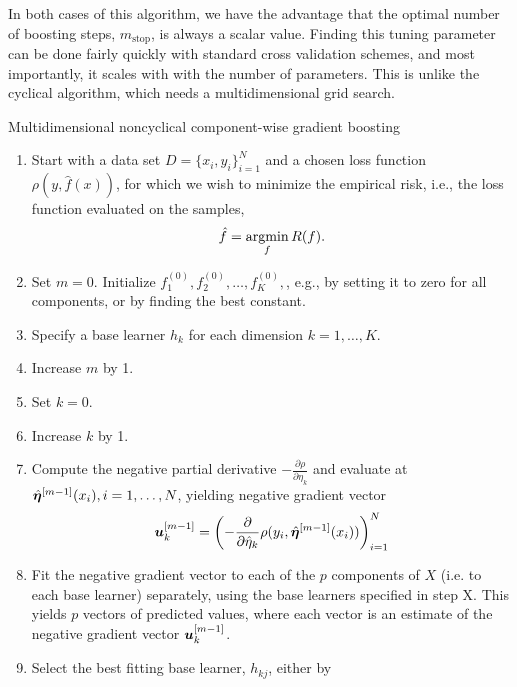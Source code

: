In both cases of this algorithm, we have the advantage that the optimal number of boosting steps, $m_{\text{stop}}$, is always a scalar value. Finding this tuning parameter can be done fairly quickly with standard cross validation schemes, and most importantly, it scales with with the number of parameters. This is unlike the cyclical algorithm, which needs a multidimensional grid search.

\begin{algorithm}
\caption{Multidimensional noncyclical component-wise gradient boosting}
\label{algo:multi-noncyclical}
\begin{enumerate}
    \item Start with a data set $D=\{x_i, y_i\}_{i=1}^N$ and a chosen loss function $\rho(y,\hat{f}(x))$, for which we wish to
        minimize the empirical risk, i.e., the loss function evaluated on the samples,
        \begin{equation}
            \hat{f}=\operatorname*{argmin}_{f}R(f).
        \end{equation}
    \item Set $m=0$. Initialize $f^{(0)}_1,f^{(0)}_2,\ldots,f^{(0)}_K,$, e.g., by setting it to zero for all components, or by finding the best constant.%
    \item Specify a base learner $h_k$ for each dimension $k=1,\ldots,K$.
    \item Increase $m$ by 1.
    \item Set $k=0$.
    \item Increase $k$ by 1.
    \item Compute the negative partial derivative $-\frac{\partial\rho}{\partial \eta_k}$
        and evaluate at $\hat{\boldsymbol{\eta}}^{[m-1]}(x_i),i=1,\ldots,N$, yielding negative gradient vector
        \begin{equation}
            \bm{u}^{[m-1]}_k=\left(-\frac{\partial}{\partial \hat{\eta}_k}\rho(y_i, \hat{\boldsymbol{\eta}}^{[m-1]}(x_i))\right)_{i=1}^N
        \end{equation}
    \item Fit the negative gradient vector to each of the $p$ components of $X$ (i.e. to each base learner) separately, using the base learners specified in step X. This yields $p$ vectors of predicted values, where each vector is an estimate of the negative gradient vector $\bm{u}^{[m-1]}_k$.
    \item Select the best fitting base learner, $h_{kj}$, either by
        \begin{itemize}

\end{itemize}
\end{enumerate}
\end{algorithm}
